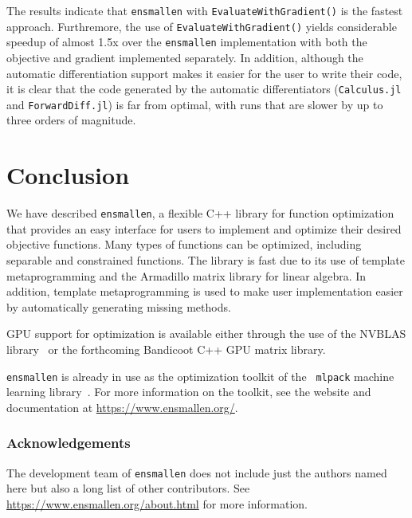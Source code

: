 \documentclass{article}
\begin{document}
The results indicate that {\tt ensmallen} with {\tt EvaluateWithGradient()}
is the fastest approach.
Furthremore, the use of {\tt EvaluateWithGradient()} yields considerable
speedup of almost 1.5x over the {\tt ensmallen} implementation with both the
objective and gradient implemented separately.  In addition, although the
automatic differentiation support makes it easier for the user to write their
code, it is clear that the code generated by the automatic differentiators
({\tt Calculus.jl} and {\tt ForwardDiff.jl})
is far from optimal, with runs that are slower by up to three orders of magnitude.

%

\vspace*{-0.3em}
\section{Conclusion}
\vspace*{-0.5em}

We have described {\tt ensmallen}, a flexible C++ library for function
optimization that provides an easy interface for users to implement and optimize
their desired objective functions.  Many types of functions can be optimized,
including separable and constrained functions.  The library is fast due to its
use of template metaprogramming and the Armadillo matrix library for linear
algebra.  In addition, template metaprogramming is used to make user
implementation easier by automatically generating missing methods.

GPU support for optimization is available either through the use of the NVBLAS
library~\cite{nvidia2015} or the forthcoming Bandicoot C++ GPU matrix library.

{\tt ensmallen} is already in use as the optimization toolkit of the {\tt
mlpack} machine learning library~\cite{mlpack2018}.  For more information on the
toolkit, see the website and documentation at \url{https://www.ensmallen.org/}.

\subsubsection*{Acknowledgements}

The development team of {\tt ensmallen} does not include just the authors named
here but also a long list of other contributors.  See
\url{https://www.ensmallen.org/about.html} for more information.



\end{document}
